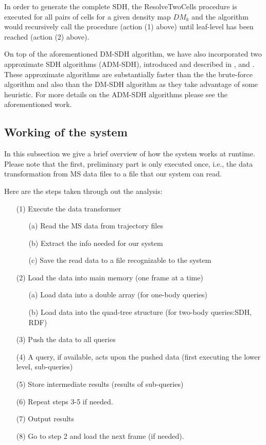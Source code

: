 \documentclass[10pt,journal,final,letterpaper,twocolumn]{IEEEtran}
\begin{document}
In order to generate the complete SDH, the {\sc ResolveTwoCells}
procedure is executed for all pairs of cells for a given density map
$DM_k$ and the algorithm would recursively call the procedure
(action (1) above) until leaf-level has been reached (action (2)
above).

On top of the aforementioned DM-SDH algorithm, we have also
incorporated two approximate SDH algorithms (ADM-SDH), introduced
and described in \cite{EDBT12}, and \cite{TKDE12}. These approximate
algorithms are substantially faster than the the brute-force
algorithm and also than the DM-SDH algorithm as they take advantage
of some heuristic. For more details on the ADM-SDH algorithms please
see the aforementioned work.




\subsection{Working of the system}

In this subsection we give a brief overview of how the system works
at runtime. Please note that the first, preliminary part is only
executed once, i.e., the data transformation from MS data files to a
file that our system can read.

Here are the steps taken through out the analysis:
\begin{itemize}
\item[(1)] Execute the data transformer
\begin{itemize}
\item[(a)] Read the MS data from trajectory files
\item[(b)] Extract the info needed for our system
\item[(c)] Save the read data to a file recognizable to the system
\end{itemize}
\item[(2)] Load the data into main memory (one frame at a time)
\begin{itemize}
\item[(a)] Load data into a double array (for one-body queries)
\item[(b)] Load data into the quad-tree structure (for two-body queries:SDH, RDF)
\end{itemize}
\item[(3)] Push the data to all queries
\item[(4)] A query, if available, acts upon the pushed data (first executing
the lower level, sub-queries)
\item[(5)] Store intermediate results (results
of sub-queries)
\item[(6)] Repeat steps 3-5 if needed.
\item[(7)] Output results
\item[(8)] Go to step 2 and load the next frame (if needed).
\end{itemize}
\end{document}
